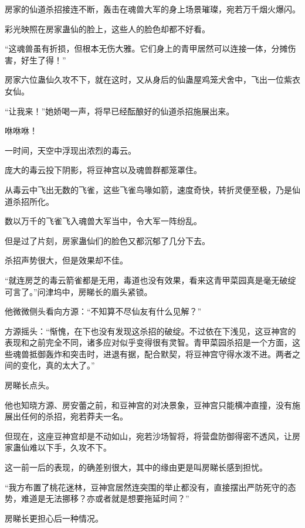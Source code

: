 
\begin{this_body}



房家的仙道杀招接连不断，轰击在魂兽大军的身上场景璀璨，宛若万千烟火爆闪。

彩光映照在房家蛊仙的脸上，这些人的脸色却都不好看。

“这魂兽虽有折损，但根本无伤大雅。它们身上的青甲居然可以连接一体，分摊伤害，好生了得！”

房家六位蛊仙久攻不下，就在这时，又从身后的仙蛊屋鸡笼犬舍中，飞出一位紫衣女仙。

“让我来！”她娇喝一声，将早已经酝酿好的仙道杀招施展出来。

咻咻咻！

一时间，天空中浮现出浓烈的毒云。

庞大的毒云投下阴影，将豆神宫以及魂兽群都笼罩住。

从毒云中飞出无数的飞雀，这些飞雀鸟喙如箭，速度奇快，转折灵便至极，乃是仙道杀招所化。

数以万千的飞雀飞入魂兽大军当中，令大军一阵纷乱。

但是过了片刻，房家蛊仙们的脸色又都沉郁了几分下去。

杀招声势很大，但是效果却不佳。

“就连房芝的毒云箭雀都是无用，毒道也没有效果，看来这青甲菜园真是毫无破绽可言了。”问津坞中，房睇长的眉头紧锁。

他微微侧头看向方源：“不知算不尽仙友有什么见解？”

方源摇头：“惭愧，在下也没有发现这杀招的破绽。不过依在下浅见，这豆神宫的表现和之前完全不同，诸多应对似乎变得很有灵智。青甲菜园杀招是一个方面，这些魂兽抵御轰炸和突击时，进退有据，配合默契，将豆神宫守得水泼不进。两者之间的变化，真的太大了。”

房睇长点头。

他也知晓方源、房安蕾之前，和豆神宫的对决景象，豆神宫只能横冲直撞，没有施展出任何的杀招，宛若莽夫一名。

但现在，这座豆神宫却是不动如山，宛若沙场智将，将营盘防御得密不透风，让房家蛊仙难以下手，久攻不下。

这一前一后的表现，的确差别很大，其中的缘由更是叫房睇长感到担忧。

“我方布置了桃花迷林，豆神宫居然连突围的举止都没有，直接摆出严防死守的态势，难道是无法挪移？亦或者就是想要拖延时间？”

房睇长更担心后一种情况。


\end{this_body}
